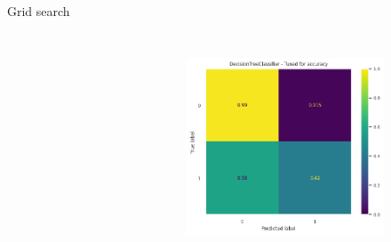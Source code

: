 \begin{frame}{\subsecname\: Grid search}
\begin{columns}[t]
\begin{figure}
\begin{columns}[t]
\begin{subfigure}[c]{\textwidth}
                        \caption{}
                        \label{fig:DT_f1macro}
                    \end{subfigure} \\
                    \vspace{-.4em} 
                    \begin{subfigure}[c]{\textwidth}
                        \includegraphics[width=\textwidth]{images/models/DT_acc.png}
                        \caption{}
                        \label{fig:DT_acc}
                    \end{subfigure}
            \end{columns}
            \vspace{-0.8em} 
            \label{fig:DT_grids}
        \end{figure}
\end{columns}

\end{frame}

